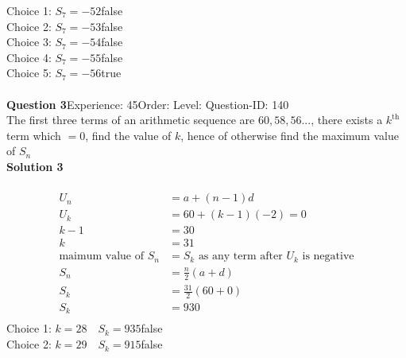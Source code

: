\documentclass{article}
\begin{document}
Choice 1: \hspace{20pt}$S_{7}=-52$\hspace{20pt}false\\
Choice 2: \hspace{20pt}$S_{7}=-53$\hspace{20pt}false\\
Choice 3: \hspace{20pt}$S_{7}=-54$\hspace{20pt}false\\
Choice 4: \hspace{20pt}$S_{7}=-55$\hspace{20pt}false\\
Choice 5: \hspace{20pt}$S_{7}=-56$\hspace{20pt}true\\
\\[4pt]
\noindent\textbf{Question 3}\hspace{20pt}Experience: 45\hspace{20pt}Order: \hspace{20pt}Level: \hspace{20pt}Question-ID: 140\\[2pt]
The first three terms of an arithmetic sequence are $60,58,56...$, there exists a $k^{\text{th}}$ term which $=0$, find the value of $k$, hence of otherwise find the maximum value of $S_n$\\[4pt]
\noindent\textbf{Solution 3}\\[2pt]
\\[-35pt]\begin{align*}
U_n&=a+(n-1)d\\[2pt]
U_k&=60+(k-1)(-2)=0\\[2pt]
k-1&=30\\[2pt]
k&=31\\[12pt]
\text{maimum value of} \,\,S_n&=S_k\,\, \text{as any term after}\,\, U_k\,\, \text{is negative}\\[2pt]
S_n&=\displaystyle\frac{n}{2}(a+d)\\[2pt]
S_k&=\displaystyle\frac{31}{2}(60+0)\\[2pt]
S_k&=930\\[-80pt]
\end{align*}
Choice 1: \hspace{20pt}$k=28 \quad S_k=935$\hspace{20pt}false\\
Choice 2: \hspace{20pt}$k=29 \quad S_k=915$\hspace{20pt}false\\
\end{document}

